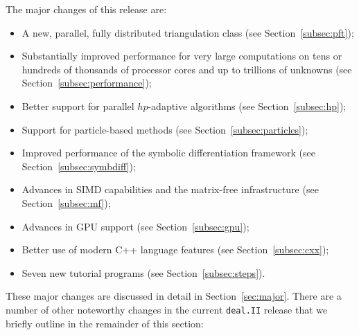 \documentclass{ansarticle-preprint}
\newcommand{\specialword}[1]{\texttt{#1}}
\newcommand{\dealii}{{\specialword{deal.II}}\xspace}
\begin{document}
The major changes of this release are:
%
\begin{itemize}
  \item A new, parallel, fully distributed triangulation class (see
        Section~\ref{subsec:pft});
  \item Substantially improved performance for very large computations
    on tens or hundreds of thousands of processor cores and up to
    trillions of unknowns (see
        Section~\ref{subsec:performance});
  \item Better support for parallel $hp$-adaptive algorithms (see
        Section~\ref{subsec:hp});
  \item Support for particle-based methods (see
        Section~\ref{subsec:particles});
  \item Improved performance of the symbolic differentiation framework (see
        Section~\ref{subsec:symbdiff});
  \item Advances in SIMD capabilities and the matrix-free infrastructure (see
        Section~\ref{subsec:mf});
  \item Advances in GPU support (see
        Section~\ref{subsec:gpu});
  \item Better use of modern C++ language features (see
        Section~\ref{subsec:cxx});
  \item Seven new tutorial programs (see
        Section~\ref{subsec:steps}).
\end{itemize}
%
These major changes are discussed in detail in Section~\ref{sec:major}. There
are a number of other noteworthy changes in the current \dealii{} release
that we briefly outline in the remainder of this section:
%
\end{document}

